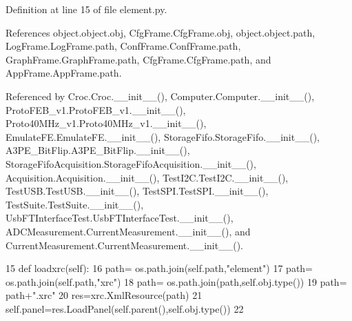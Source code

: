 Definition at line 15 of file element.\+py.



References object.\+object.\+obj, Cfg\+Frame.\+Cfg\+Frame.\+obj, object.\+object.\+path, Log\+Frame.\+Log\+Frame.\+path, Conf\+Frame.\+Conf\+Frame.\+path, Graph\+Frame.\+Graph\+Frame.\+path, Cfg\+Frame.\+Cfg\+Frame.\+path, and App\+Frame.\+App\+Frame.\+path.



Referenced by Croc.\+Croc.\+\_\+\+\_\+init\+\_\+\+\_\+(), Computer.\+Computer.\+\_\+\+\_\+init\+\_\+\+\_\+(), Proto\+F\+E\+B\+\_\+v1.\+Proto\+F\+E\+B\+\_\+v1.\+\_\+\+\_\+init\+\_\+\+\_\+(), Proto40\+M\+Hz\+\_\+v1.\+Proto40\+M\+Hz\+\_\+v1.\+\_\+\+\_\+init\+\_\+\+\_\+(), Emulate\+F\+E.\+Emulate\+F\+E.\+\_\+\+\_\+init\+\_\+\+\_\+(), Storage\+Fifo.\+Storage\+Fifo.\+\_\+\+\_\+init\+\_\+\+\_\+(), A3\+P\+E\+\_\+\+Bit\+Flip.\+A3\+P\+E\+\_\+\+Bit\+Flip.\+\_\+\+\_\+init\+\_\+\+\_\+(), Storage\+Fifo\+Acquisition.\+Storage\+Fifo\+Acquisition.\+\_\+\+\_\+init\+\_\+\+\_\+(), Acquisition.\+Acquisition.\+\_\+\+\_\+init\+\_\+\+\_\+(), Test\+I2\+C.\+Test\+I2\+C.\+\_\+\+\_\+init\+\_\+\+\_\+(), Test\+U\+S\+B.\+Test\+U\+S\+B.\+\_\+\+\_\+init\+\_\+\+\_\+(), Test\+S\+P\+I.\+Test\+S\+P\+I.\+\_\+\+\_\+init\+\_\+\+\_\+(), Test\+Suite.\+Test\+Suite.\+\_\+\+\_\+init\+\_\+\+\_\+(), Usb\+F\+T\+Interface\+Test.\+Usb\+F\+T\+Interface\+Test.\+\_\+\+\_\+init\+\_\+\+\_\+(), A\+D\+C\+Measurement.\+Current\+Measurement.\+\_\+\+\_\+init\+\_\+\+\_\+(), and Current\+Measurement.\+Current\+Measurement.\+\_\+\+\_\+init\+\_\+\+\_\+().


\begin{DoxyCode}
15     \textcolor{keyword}{def }loadxrc(self):
16         path= os.path.join(self.path,\textcolor{stringliteral}{"element"})
17         path= os.path.join(self.path,\textcolor{stringliteral}{"xrc"})
18         path= os.path.join(path,self.obj.type())
19         path= path+\textcolor{stringliteral}{".xrc"}
20         res=xrc.XmlResource(path)
21         self.panel=res.LoadPanel(self.parent(),self.obj.type())
22             
\end{DoxyCode}
\mbox{\label{classProtoFEB__v1_1_1ProtoFEB__v1_a13917550359353e22ea8ee17d856d472}} 
